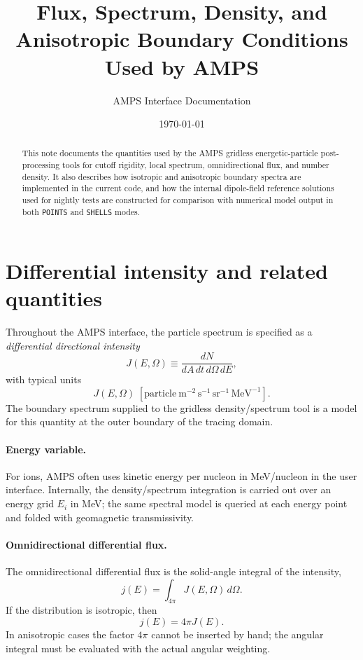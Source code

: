 \documentclass[11pt]{article}
\title{Flux, Spectrum, Density, and Anisotropic Boundary Conditions Used by AMPS}
\author{AMPS Interface Documentation}
\date{\today}
\begin{document}
\maketitle

\begin{abstract}
This note documents the quantities used by the AMPS gridless energetic-particle
post-processing tools for cutoff rigidity, local spectrum, omnidirectional flux,
and number density. It also describes how isotropic and anisotropic boundary
spectra are implemented in the current code, and how the internal dipole-field
reference solutions used for nightly tests are constructed for comparison with
numerical model output in both \texttt{POINTS} and \texttt{SHELLS} modes.
\end{abstract}

\section{Differential intensity and related quantities}
Throughout the AMPS interface, the particle spectrum is specified as a
\emph{differential directional intensity}
\begin{equation}
  J(E,\Omega) \equiv \frac{dN}{dA\,dt\,d\Omega\,dE},
\end{equation}
with typical units
\begin{equation}
  J(E,\Omega)\;[\text{particle}~\text{m}^{-2}\,\text{s}^{-1}\,\text{sr}^{-1}\,\text{MeV}^{-1}].
\end{equation}
The boundary spectrum supplied to the gridless density/spectrum tool is a model
for this quantity at the outer boundary of the tracing domain.

\paragraph{Energy variable.}
For ions, AMPS often uses kinetic energy per nucleon in \si{MeV/nucleon} in the
user interface. Internally, the density/spectrum integration is carried out over
an energy grid $E_i$ in \si{MeV}; the same spectral model is queried at each
energy point and folded with geomagnetic transmissivity.

\paragraph{Omnidirectional differential flux.}
The omnidirectional differential flux is the solid-angle integral of the
intensity,
\begin{equation}
  j(E) = \int_{4\pi} J(E,\Omega)\,d\Omega.
\end{equation}
If the distribution is isotropic, then
\begin{equation}
  j(E)=4\pi J(E).
\end{equation}
In anisotropic cases the factor $4\pi$ cannot be inserted by hand; the angular
integral must be evaluated with the actual angular weighting.
\end{document}
